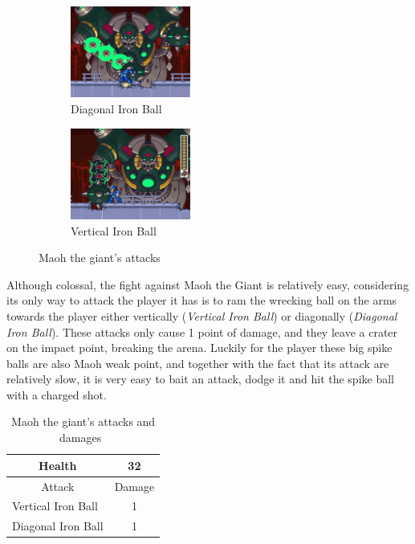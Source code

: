 \begin{figure}[htp]
\centering
\begin{subfigure}{0.4\linewidth}
	\centering
	\includegraphics[height=3cm]{figures/X3/Diagonal_Ball.jpg}
	\caption{Diagonal Iron Ball}
\end{subfigure}
\begin{subfigure}{0.4\linewidth}
	\centering
	\includegraphics[height=3cm]{figures/X3/Vertiacal_Ball.jpg}
	\caption{Vertical Iron Ball}
\end{subfigure}
\caption{Maoh the giant's attacks}
\end{figure}
Although colossal, the fight against Maoh the Giant is relatively easy, considering its only way to attack the player it has is to ram the wrecking ball on the arms towards the player either vertically (\emph{Vertical Iron Ball}) or diagonally (\emph{Diagonal Iron Ball}). These  attacks only cause 1 point of damage, and they leave a crater on the impact point, breaking the arena. Luckily for the player these big spike balls are also Maoh weak point, and together with the fact that its attack are relatively slow, it is very easy to bait an attack, dodge it and hit the spike ball with a charged shot.
\begin{table}[htp]
	\centering
	\begin{tabular}[h]{l c}
		\toprule
		\multicolumn{1}{c}{Health}  & 32\\
		\midrule
		\multicolumn{1}{c}{Attack} & \multicolumn{1}{c}{Damage}\\
		Vertical Iron Ball & 1 \\
		Diagonal Iron Ball & 1\\
		\bottomrule
	\end{tabular}
	\caption{Maoh the giant's attacks and damages~\cite{book:Compendium,wiki:Maoh}}
\end{table}

